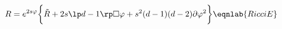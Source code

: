 \begin{align}
%
%
%
&R = e^{2s\varphi}\bigg\{\tilde R + 2s\lp d-1\rp\Box\varphi + s^2(d-1)(d-2)\partial\varphi^2\bigg\}
\eqnlab{RicciE}
\end{align}
